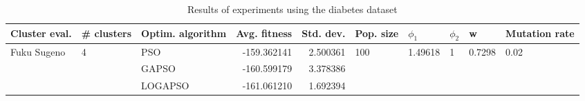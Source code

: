 \begin{table}
\centering
\caption{Results of experiments using the diabetes dataset}
\begin{tabular}{lllrrlllll}
\toprule
               Cluster eval. &        \# clusters & Optim. algorithm &  Avg. fitness &  Std. dev. &            Pop. size &               $\phi_{1}$ &         $\phi_{2}$ &                       w &         Mutation rate \\
\midrule
\multirow{3}{*}{Fuku Sugeno} & \multirow{3}{*}{4} &              PSO &   -159.362141 &   2.500361 & \multirow{3}{*}{100} & \multirow{3}{*}{1.49618} & \multirow{3}{*}{1} & \multirow{3}{*}{0.7298} & \multirow{3}{*}{0.02} \\
                             &                    &            GAPSO &   -160.599179 &   3.378386 &                      &                          &                    &                         &                       \\
                             &                    &          LOGAPSO &   -161.061210 &   1.692394 &                      &                          &                    &                         &                       \\
\bottomrule
\end{tabular}
\end{table}
